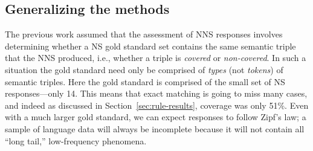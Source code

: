 %
%
%

\subsection{Generalizing the methods}
\label{sec:ranking}

The previous work assumed that the assessment of NNS responses
involves determining whether a NS gold standard set contains the same
semantic triple that the NNS produced, i.e., whether a triple
is \textit{covered} or \textit{non-covered}.  In such a situation the
gold standard need only be comprised of \textit{types} (not \textit{tokens}) of semantic triples. Here the gold standard is comprised of the small set of NS responses---only 14. This means that exact matching is going to miss many cases,
and indeed as discussed in Section~\ref{sec:rule-results}, coverage was only 51\%. Even with a much larger gold standard, we can expect responses to follow Zipf's law; a sample of language data will always be incomplete because it will not contain all ``long tail,'' low-frequency phenomena.

